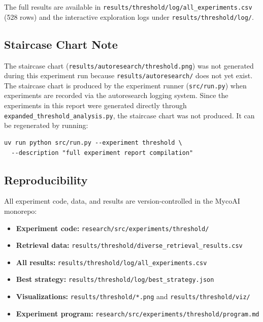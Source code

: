 \documentclass[11pt,a4paper]{article}
\begin{document}
\noindent The full results are available in \texttt{results/threshold/log/all\_experiments.csv} (528 rows) and the interactive exploration logs under \texttt{results/threshold/log/}.

\subsection{Staircase Chart Note}
\label{sec:staircase_note}

The staircase chart (\texttt{results/autoresearch/threshold.png}) was not generated during this experiment run because \texttt{results/autoresearch/} does not yet exist. The staircase chart is produced by the experiment runner (\texttt{src/run.py}) when experiments are recorded via the autoresearch logging system. Since the experiments in this report were generated directly through \texttt{expanded\_threshold\_analysis.py}, the staircase chart was not produced. It can be regenerated by running:

\begin{verbatim}
uv run python src/run.py --experiment threshold \
  --description "full experiment report compilation"
\end{verbatim}

\subsection{Reproducibility}

All experiment code, data, and results are version-controlled in the MycoAI monorepo:

\begin{itemize}
  \item \textbf{Experiment code:} \texttt{research/src/experiments/threshold/}
  \item \textbf{Retrieval data:} \texttt{results/threshold/diverse\_retrieval\_results.csv}
  \item \textbf{All results:} \texttt{results/threshold/log/all\_experiments.csv}
  \item \textbf{Best strategy:} \texttt{results/threshold/log/best\_strategy.json}
  \item \textbf{Visualizations:} \texttt{results/threshold/*.png} and \texttt{results/threshold/viz/}
  \item \textbf{Experiment program:} \texttt{research/src/experiments/threshold/program.md}
\end{itemize}

\vspace{1cm}
\end{document}
